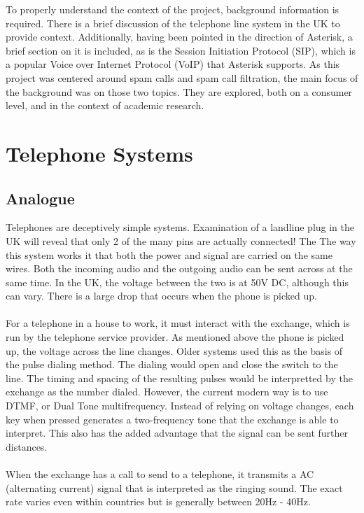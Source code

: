 \documentclass[main.tex]{subfiles}
\begin{document}
To properly understand the context of the project, background information is required. There is a brief discussion of the telephone line system in the UK to provide context. Additionally, having been pointed in the direction of Asterisk, a brief section on it is included, as is the Session Initiation Protocol (SIP), which is a popular Voice over Internet Protocol (VoIP) that Asterisk supports. As this project was centered around spam calls and  spam call filtration, the main focus of the background was on those two topics. They are explored, both on a consumer level, and in the context of academic research.

\section{Telephone Systems}
\subsection{Analogue}
Telephones are deceptively simple systems. Examination of a landline plug in the UK will reveal that only 2 of the many pins are actually connected! The The way this system works it that both the power and signal are carried on the same wires. Both the incoming audio and the outgoing audio can be sent across at the same time. In the UK, the voltage between the two is at 50V DC, although this can vary. There is a large drop that occurs when the phone is picked up. \cite{telephone}
\\\\
For a telephone in a house to work, it must interact with the exchange, which is run by the telephone service provider. As mentioned above the phone is picked up, the voltage across the line changes. Older systems used this as the basis of the pulse dialing method. The dialing would open and close the switch to the line. The timing and spacing of the resulting pulses would be interpretted by the exchange as the number dialed. However, the current modern way is to use DTMF, or Dual Tone multifrequency. Instead of relying on voltage changes, each key when pressed generates a two-frequency tone that the exchange is able to interpret. This also has the added advantage that the signal can be sent further distances. \cite{telephone}
\\\\
When the exchange has a call to send to a telephone, it transmits a AC (alternating current) signal that is interpreted as the ringing sound. The exact rate varies even within countries but is generally between 20Hz - 40Hz. \cite{telephone}
\end{document}
